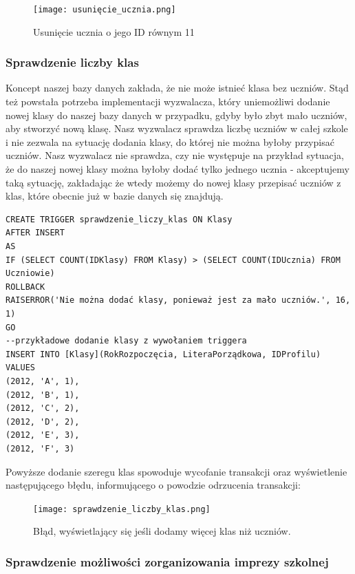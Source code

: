 \documentclass[60pt]{article}
\begin{document}
\begin{figure}[h]
  \texttt{[image: usunięcie\_ucznia.png]}
  \caption{Usunięcie ucznia o jego ID równym 11}
  \label{Usunięcie ucznia o jego ID równym 11}
\end{figure}

\subsubsection{Sprawdzenie liczby klas}

Koncept naszej bazy danych zakłada, że nie może istnieć klasa bez uczniów. Stąd też powstała potrzeba implementacji wyzwalacza, który uniemożliwi dodanie nowej klasy do naszej bazy danych w przypadku, gdyby było zbyt mało uczniów, aby stworzyć nową klasę. Nasz wyzwalacz sprawdza liczbę uczniów w całej szkole i nie zezwala na sytuację dodania klasy, do której nie można byłoby przypisać uczniów. Nasz wyzwalacz nie sprawdza, czy nie występuje na przykład sytuacja, że do naszej nowej klasy można byłoby dodać tylko jednego ucznia - akceptujemy taką sytuację, zakładając że wtedy możemy do nowej klasy przepisać uczniów z klas, które obecnie już w bazie danych się znajdują. 

\begin{verbatim}
CREATE TRIGGER sprawdzenie_liczy_klas ON Klasy
AFTER INSERT
AS
IF (SELECT COUNT(IDKlasy) FROM Klasy) > (SELECT COUNT(IDUcznia) FROM Uczniowie)
ROLLBACK
RAISERROR('Nie można dodać klasy, ponieważ jest za mało uczniów.', 16, 1)
GO
--przykładowe dodanie klasy z wywołaniem triggera
INSERT INTO [Klasy](RokRozpoczęcia, LiteraPorządkowa, IDProfilu) VALUES
(2012, 'A', 1),
(2012, 'B', 1),
(2012, 'C', 2),
(2012, 'D', 2),
(2012, 'E', 3),
(2012, 'F', 3)
\end{verbatim}

Powyższe dodanie szeregu klas spowoduje wycofanie transakcji oraz wyświetlenie następującego błędu, informującego o powodzie odrzucenia transakcji:

\begin{figure}[h]
  \texttt{[image: sprawdzenie\_liczby\_klas.png]}
  \caption{Błąd, wyświetlający się jeśli dodamy więcej klas niż uczniów.}
  \label{Błąd, wyświetlający się jeśli dodamy więcej klas niż uczniów.}
\end{figure}

\subsubsection{Sprawdzenie możliwości zorganizowania imprezy szkolnej}
\end{document}
